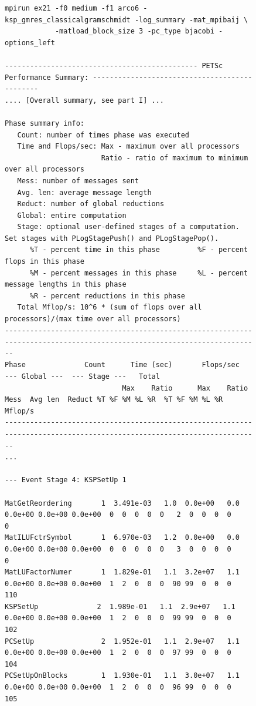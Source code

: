 \begin{figure}[tb]
{\tiny
\begin{verbatim}
mpirun ex21 -f0 medium -f1 arco6 -ksp_gmres_classicalgramschmidt -log_summary -mat_mpibaij \
            -matload_block_size 3 -pc_type bjacobi -options_left

---------------------------------------------- PETSc Performance Summary: ----------------------------------------------
.... [Overall summary, see part I] ...

Phase summary info:
   Count: number of times phase was executed
   Time and Flops/sec: Max - maximum over all processors
                       Ratio - ratio of maximum to minimum over all processors
   Mess: number of messages sent
   Avg. len: average message length
   Reduct: number of global reductions
   Global: entire computation
   Stage: optional user-defined stages of a computation. Set stages with PLogStagePush() and PLogStagePop().
      %T - percent time in this phase         %F - percent flops in this phase
      %M - percent messages in this phase     %L - percent message lengths in this phase
      %R - percent reductions in this phase
   Total Mflop/s: 10^6 * (sum of flops over all processors)/(max time over all processors)
------------------------------------------------------------------------------------------------------------------------
Phase              Count      Time (sec)       Flops/sec                          --- Global ---  --- Stage ---   Total
                            Max    Ratio      Max    Ratio  Mess  Avg len  Reduct %T %F %M %L %R  %T %F %M %L %R Mflop/s
------------------------------------------------------------------------------------------------------------------------
...
 
--- Event Stage 4: KSPSetUp 1

MatGetReordering       1  3.491e-03   1.0  0.0e+00   0.0  0.0e+00 0.0e+00 0.0e+00  0  0  0  0  0   2  0  0  0  0     0
MatILUFctrSymbol       1  6.970e-03   1.2  0.0e+00   0.0  0.0e+00 0.0e+00 0.0e+00  0  0  0  0  0   3  0  0  0  0     0
MatLUFactorNumer       1  1.829e-01   1.1  3.2e+07   1.1  0.0e+00 0.0e+00 0.0e+00  1  2  0  0  0  90 99  0  0  0   110
KSPSetUp              2  1.989e-01   1.1  2.9e+07   1.1  0.0e+00 0.0e+00 0.0e+00  1  2  0  0  0  99 99  0  0  0   102
PCSetUp                2  1.952e-01   1.1  2.9e+07   1.1  0.0e+00 0.0e+00 0.0e+00  1  2  0  0  0  97 99  0  0  0   104
PCSetUpOnBlocks        1  1.930e-01   1.1  3.0e+07   1.1  0.0e+00 0.0e+00 0.0e+00  1  2  0  0  0  96 99  0  0  0   105


\end{verbatim}}
\end{figure}

